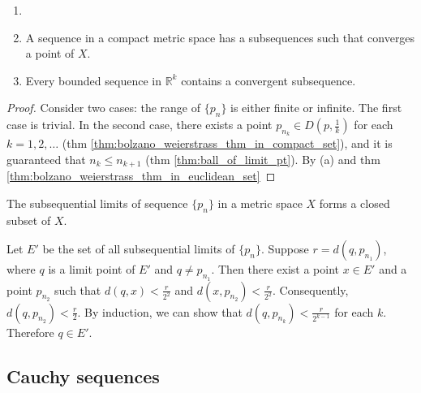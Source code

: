 \begin{theorem}
\label{thm:bolzano_weierstrass_thm_in_compact_space}
\begin{enumerate}[label={(\alph*)}]
\item[]
\item A sequence in a compact metric space has a subsequences such that converges a point of $X$.
\item Every bounded sequence in $\mathbb{R}^k$ contains a convergent subsequence.
\end{enumerate}
\end{theorem}
\begin{proof}
 Consider two cases: the range of $\{p_n\}$ is either finite or infinite. The first case is trivial. In the second case, there exists a point $p_{n_k}\in D(p,\frac{1}{k})$ for each $k=1,2,\dots$ (thm \ref{thm:bolzano_weierstrass_thm_in_compact_set}), and it is guaranteed that $n_k\leq n_{k+1}$ (thm \ref{thm:ball_of_limit_pt}).
 By (a) and thm \ref{thm:bolzano_weierstrass_thm_in_euclidean_set}
\end{proof}

\begin{theorem}
\label{thm:subseq_limits_closed}
The subsequential limits of sequence $\{p_n\}$ in a metric space $X$ forms a closed subset of $X$.
\end{theorem}
\begin{hardproof}
Let $E'$ be the set of all subsequential limits of $\{p_n\}$. Suppose $r = d(q,p_{n_1})$, where $q$ is a limit point of $E'$ and $q\neq p_{n_1}$. Then there exist a point $x\in E'$ and a point $p_{n_2}$ such that $d(q,x)<\frac{r}{2^2}$ and $d(x,p_{n_2})<\frac{r}{2^2}$. Consequently, $d(q,p_{n_2})<\frac{r}{2}$. By induction, we can show that $d(q,p_{n_k})<\frac{r}{2^{k-1}}$ for each $k$. Therefore $q\in E'$.
\end{hardproof}

\subsection{Cauchy sequences}


